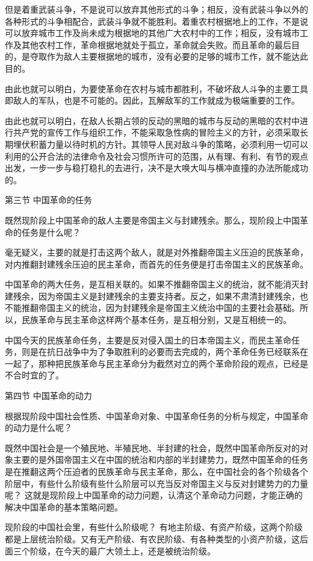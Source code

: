 \documentclass[UTF8, 12pt, a4paper]{ctexrep}
\begin{document}
但是着重武装斗争，不是说可以放弃其他形式的斗争；相反，没有武装斗争以外的各种形式的斗争相配合，武装斗争就不能胜利。着重农村根据地上的工作，不是说可以放弃城市工作及尚未成为根据地的其他广大农村中的工作；相反，没有城市工作及其他农村工作，革命根据地就处于孤立，革命就会失败。而且革命的最后目的，是夺取作为敌人主要根据地的城市，没有必要的足够的城市工作，就不能达此目的。

由此也就可以明白，为要使革命在农村与城市都胜利，不破坏敌人斗争的主要工具即敌人的军队，也是不可能的。因此，瓦解敌军的工作就成为极端重要的工作。

由此也就可以明白，在敌人长期占领的反动的黑暗的城市与反动的黑暗的农村中进行共产党的宣传工作与组织工作，不能采取急性病的冒险主义的方针，必须采取长期埋伏积蓄力量以待时机的方针。其领导人民对敌斗争的策略，必须利用一切可以利用的公开合法的法律命令及社会习惯所许可的范围，从有理、有利、有节的观点出发，一步一步与稳打稳扎的去进行，决不是大唤大叫与横冲直撞的办法所能成功的。

第三节 中国革命的任务

既然现阶段上中国革命的敌人主要是帝国主义与封建残余。那么，现阶段上中国革命的任务是什么呢？

毫无疑义，主要的就是打击这两个敌人，就是对外推翻帝国主义压迫的民族革命，对内推翻封建残余压迫的民主革命，而首先的任务便是打击帝国主义的民族革命。

中国革命的两大任务，是互相关联的。如果不推翻帝国主义的统治，就不能消灭封建残余，因为帝国主义是封建残余的主要支持者。反之，如果不肃清封建残余，也不能推翻帝国主义的统治，因为封建残余是帝国主义统治中国的主要社会基础。所以，民族革命与民主革命这样两个基本任务，是互相分别，又是互相统一的。

中国今天的民族革命任务，主要是反对侵入国土的日本帝国主义，而民主革命任务，则是在抗日战争中为了争取胜利的必要而去完成的，两个革命任务已经联系在一起了，那种把民族革命与民主革命分为截然对立的两个革命阶段的观点，已经是不合时宜的了。

第四节 中国革命的动力

根据现阶段中国社会性质、中国革命对象、中国革命任务的分析与规定，中国革命的动力是什么呢？

既然中国社会是一个殖民地、半殖民地、半封建的社会，既然中国革命所反对的对象主要的是外国帝国主义在中国的统治和内部的半封建势力，既然中国革命的任务是在推翻这两个压迫者的民族革命与民主革命，那么，在中国社会的各个阶级各个阶层中，有些什么阶级有些什么阶层可以充当反对帝国主义与反对封建势力的力量呢？ 这就是现阶段上中国革命的动力问题，认清这个革命动力问题，才能正确的解决中国革命的基本策略问题。

现阶段的中国社会里，有些什么阶级呢？ 有地主阶级、有资产阶级，这两个阶级都是上层统治阶级。又有无产阶级、有农民阶级、有各种类型的小资产阶级，这后面三个阶级，在今天的最广大领土上，还是被统治阶级。
\end{document}
